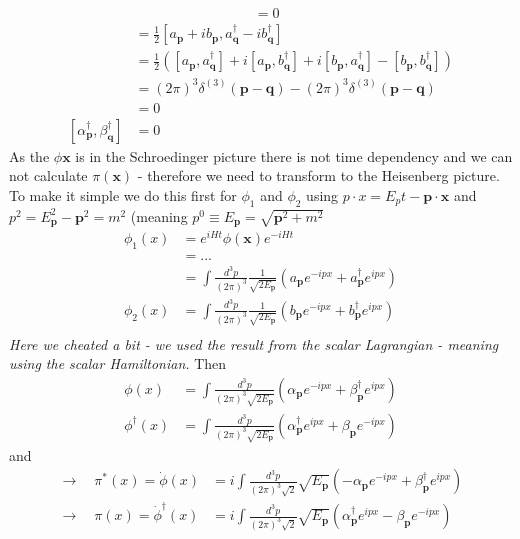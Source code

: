 \documentclass[../main.tex]{subfiles}
\begin{document}
\begin{enumerate}[(a)]
\begin{align}
&=0
\end{align}
\begin{align}
[\alpha_\mathbf{p},\beta^\dagger_\mathbf{q}]
&=\frac{1}{2}[a_\mathbf{p}+ib_\mathbf{p},a^\dagger_\mathbf{q}-ib^\dagger_\mathbf{q}]\\
&=\frac{1}{2}([a_\mathbf{p},a^\dagger_\mathbf{q}]+i[a_\mathbf{p},b^\dagger_\mathbf{q}]+i[b_\mathbf{p},a^\dagger_\mathbf{q}]-[b_\mathbf{p},b^\dagger_\mathbf{q}])\\
&=(2\pi)^3\delta^{(3)}(\mathbf{p}-\mathbf{q})-(2\pi)^3\delta^{(3)}(\mathbf{p}-\mathbf{q})\\
&=0\\
[\alpha^\dagger_\mathbf{p},\beta^\dagger_\mathbf{q}]&=0
\end{align}
As the $\phi{\mathbf{x}}$ is in the Schroedinger picture there is not time dependency and we can not calculate $\pi(\mathbf{x})$ - therefore we need to transform to the Heisenberg picture. To make it simple we do this first for $\phi_1$ and $\phi_2$ using $p\cdot x=E_pt-\mathbf{p}\cdot\mathbf{x}$ and $p^2=E_\mathbf{p}^2-\mathbf{p}^2=m^2$ (meaning $p^0\equiv E_\mathbf{p}=\sqrt{\mathbf{p}^2+m^2}$
\begin{align}
\phi_1(x)
&=e^{iHt}\phi(\mathbf{x})e^{-iHt}\\
&=...\\
&=\int\frac{d^3p}{(2\pi)^3}\frac{1}{\sqrt{2E_\mathbf{p}}}(a_\mathbf{p}e^{-ipx}+a^\dagger_\mathbf{p}e^{ipx})\\
\phi_2(x)
&=\int\frac{d^3p}{(2\pi)^3}\frac{1}{\sqrt{2E_\mathbf{p}}}(b_\mathbf{p}e^{-ipx}+b^\dagger_\mathbf{p}e^{ipx})\\
\end{align}
{\it Here we cheated a bit - we used the result from the scalar Lagrangian - meaning using the scalar Hamiltonian.}
Then
\begin{align}
\phi(x)
&=\int\frac{d^3p}{(2\pi)^3\sqrt{2E_\mathbf{p}}}\left(\alpha_\mathbf{p}e^{-ipx}+\beta^\dagger_\mathbf{p} e^{ipx}\right)\\
\phi^\dagger(x)
&=\int\frac{d^3p}{(2\pi)^3\sqrt{2E_\mathbf{p}}}\left(\alpha^\dagger_\mathbf{p}e^{ipx}+\beta_\mathbf{p}e^{-ipx}\right)
\end{align}
and
\begin{align}
\rightarrow\quad\pi^*(x)=\dot{\phi}(x)
&=i\int\frac{d^3p}{(2\pi)^3\sqrt{2}}\sqrt{E_\mathbf{p}}\left(-\alpha_\mathbf{p}e^{-ipx}+\beta^\dagger_\mathbf{p} e^{ipx}\right)\\
\rightarrow\quad\pi(x)=\dot{\phi}^\dagger(x)
&=i\int\frac{d^3p}{(2\pi)^3\sqrt{2}}\sqrt{E_\mathbf{p}}\left(\alpha^\dagger_\mathbf{p}e^{ipx}-\beta_\mathbf{p} e^{-ipx}\right)

\end{align}
\end{enumerate}
\end{document}
